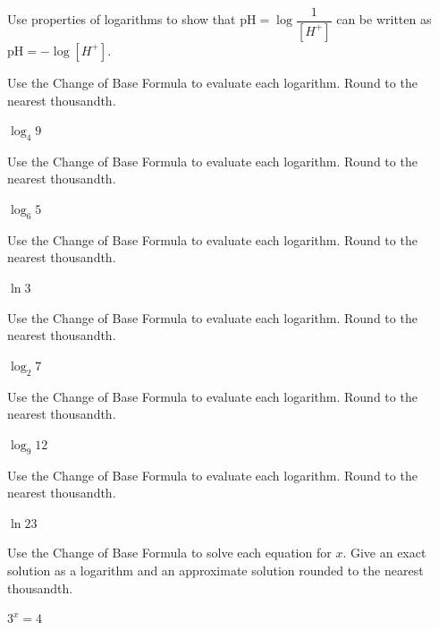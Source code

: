 \documentclass{article}
\newenvironment{practice}[2]{}{}        %
\newcommand{\answer}[1]{}               %
\begin{document}
\begin{practice}{23}{2}
Use properties of logarithms to show that $\mathrm{pH}=\log\dfrac{1}{[H^+]}$ can be written as $\mathrm{pH}=-\log[H^+]$.

\answer{$\mathrm{pH}=\log\left(\dfrac{1}{[H^+]}\right)=\log1-\log[H^+]=0-\log[H^+]=-\log[H^+]$}
\end{practice}

\begin{practice}{24}{1}
Use the Change of Base Formula to evaluate each logarithm. Round to the nearest thousandth.

$\log_4 9$

\answer{1.585}
\end{practice}

\begin{practice}{25}{1}
Use the Change of Base Formula to evaluate each logarithm. Round to the nearest thousandth.

$\log_6 5$

\answer{0.898}
\end{practice}

\begin{practice}{26}{1}
Use the Change of Base Formula to evaluate each logarithm. Round to the nearest thousandth.

$\ln3$

\answer{1.099}
\end{practice}

\begin{practice}{27}{1}
Use the Change of Base Formula to evaluate each logarithm. Round to the nearest thousandth.

$\log_2 7$

\answer{2.807}
\end{practice}

\begin{practice}{28}{1}
Use the Change of Base Formula to evaluate each logarithm. Round to the nearest thousandth.

$\log_9 12$

\answer{1.131}
\end{practice}

\begin{practice}{29}{1}
Use the Change of Base Formula to evaluate each logarithm. Round to the nearest thousandth.

$\ln23$

\answer{3.135}
\end{practice}

\begin{practice}{30}{1}
Use the Change of Base Formula to solve each equation for $x$. Give an exact solution as a logarithm and an approximate solution rounded to the nearest thousandth.

$3^x=4$

\answer{$\dfrac{\log4}{\log3}$; 1.262}
\end{practice}
\end{document}
